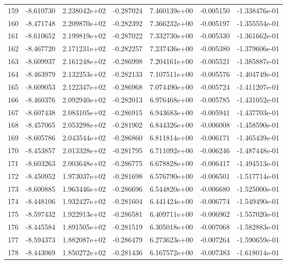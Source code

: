 \begin{tabular}{rrrrrrr}
 159 &  -8.610730 &  2.238042e+02 & -0.287024 &  7.460139e+00 &   -0.005150 & -1.338476e-01 \\
 160 &  -8.471748 &  2.209870e+02 & -0.282392 &  7.366232e+00 &   -0.005197 & -1.355554e-01 \\
 161 &  -8.610652 &  2.199819e+02 & -0.287022 &  7.332730e+00 &   -0.005330 & -1.361662e-01 \\
 162 &  -8.467720 &  2.171231e+02 & -0.282257 &  7.237436e+00 &   -0.005380 & -1.379606e-01 \\
 163 &  -8.609937 &  2.161248e+02 & -0.286998 &  7.204161e+00 &   -0.005521 & -1.385887e-01 \\
 164 &  -8.463979 &  2.132253e+02 & -0.282133 &  7.107511e+00 &   -0.005576 & -1.404749e-01 \\
 165 &  -8.609053 &  2.122347e+02 & -0.286968 &  7.074490e+00 &   -0.005724 & -1.411207e-01 \\
 166 &  -8.460376 &  2.092940e+02 & -0.282013 &  6.976468e+00 &   -0.005785 & -1.431052e-01 \\
 167 &  -8.607438 &  2.083105e+02 & -0.286915 &  6.943683e+00 &   -0.005941 & -1.437703e-01 \\
 168 &  -8.457065 &  2.053298e+02 & -0.281902 &  6.844326e+00 &   -0.006008 & -1.458590e-01 \\
 169 &  -8.605786 &  2.043544e+02 & -0.286860 &  6.811814e+00 &   -0.006171 & -1.465439e-01 \\
 170 &  -8.453857 &  2.013328e+02 & -0.281795 &  6.711092e+00 &   -0.006246 & -1.487448e-01 \\
 171 &  -8.603263 &  2.003648e+02 & -0.286775 &  6.678828e+00 &   -0.006417 & -1.494513e-01 \\
 172 &  -8.450952 &  1.973037e+02 & -0.281698 &  6.576790e+00 &   -0.006501 & -1.517714e-01 \\
 173 &  -8.600885 &  1.963446e+02 & -0.286696 &  6.544820e+00 &   -0.006680 & -1.525000e-01 \\
 174 &  -8.448106 &  1.932427e+02 & -0.281604 &  6.441424e+00 &   -0.006774 & -1.549490e-01 \\
 175 &  -8.597432 &  1.922913e+02 & -0.286581 &  6.409711e+00 &   -0.006962 & -1.557020e-01 \\
 176 &  -8.445584 &  1.891505e+02 & -0.281519 &  6.305018e+00 &   -0.007068 & -1.582883e-01 \\
 177 &  -8.594373 &  1.882087e+02 & -0.286479 &  6.273623e+00 &   -0.007264 & -1.590659e-01 \\
 178 &  -8.443069 &  1.850272e+02 & -0.281436 &  6.167572e+00 &   -0.007383 & -1.618014e-01 \\

\end{tabular}

